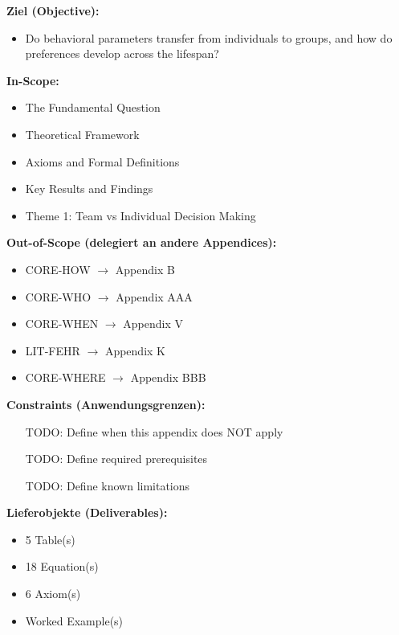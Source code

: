 \begin{tcolorbox}[
    colback=orange!5!white,
    colframe=orange!75!black,
    title={\textbf{Appendix Scope: Ziel / In-Scope / Out-of-Scope / Constraints}},
    fonttitle=\bfseries
]

\textbf{Ziel (Objective):}
\begin{itemize}[nosep]
    \item Do behavioral parameters transfer from individuals to groups, and how do preferences develop across the lifespan?
\end{itemize}

\textbf{In-Scope:}
\begin{itemize}[nosep]
    \item The Fundamental Question
    \item Theoretical Framework
    \item Axioms and Formal Definitions
    \item Key Results and Findings
    \item Theme 1: Team vs Individual Decision Making
\end{itemize}

\textbf{Out-of-Scope (delegiert an andere Appendices):}
\begin{itemize}[nosep]
    \item CORE-HOW $\rightarrow$ Appendix B
    \item CORE-WHO $\rightarrow$ Appendix AAA
    \item CORE-WHEN $\rightarrow$ Appendix V
    \item LIT-FEHR $\rightarrow$ Appendix K
    \item CORE-WHERE $\rightarrow$ Appendix BBB
\end{itemize}

\textbf{Constraints (Anwendungsgrenzen):}
\begin{itemize}[nosep]
    \item [TODO: Define when this appendix does NOT apply]
    \item [TODO: Define required prerequisites]
    \item [TODO: Define known limitations]
\end{itemize}

\textbf{Lieferobjekte (Deliverables):}
\begin{itemize}[nosep]
    \item 5 Table(s)
    \item 18 Equation(s)
    \item 6 Axiom(s)
    \item Worked Example(s)
\end{itemize}

\end{tcolorbox}




